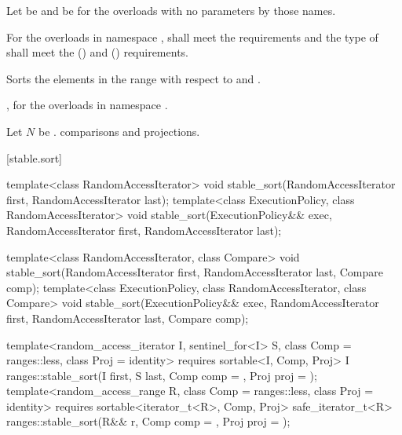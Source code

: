 \begin{itemdescr}
\pnum
Let  be 
and  be 
for the overloads with no parameters by those names.

\pnum
\requires
For the overloads in namespace ,
 shall meet
the  requirements and
the type of  shall meet
the  () and
 () requirements.

\pnum
\effects
Sorts the elements in the range 
with respect to  and .

\pnum
\returns
{}, for the overloads in namespace .

\pnum
\complexity
Let $N$ be .
 comparisons and projections.
\end{itemdescr}

[stable.sort]{}

%
\begin{itemdecl}
template<class RandomAccessIterator>
  void stable_sort(RandomAccessIterator first, RandomAccessIterator last);
template<class ExecutionPolicy, class RandomAccessIterator>
  void stable_sort(ExecutionPolicy&& exec,
                   RandomAccessIterator first, RandomAccessIterator last);

template<class RandomAccessIterator, class Compare>
  void stable_sort(RandomAccessIterator first, RandomAccessIterator last,
                   Compare comp);
template<class ExecutionPolicy, class RandomAccessIterator, class Compare>
  void stable_sort(ExecutionPolicy&& exec,
                   RandomAccessIterator first, RandomAccessIterator last,
                   Compare comp);

template<random_access_iterator I, sentinel_for<I> S, class Comp = ranges::less,
         class Proj = identity>
  requires sortable<I, Comp, Proj>
  I ranges::stable_sort(I first, S last, Comp comp = {}, Proj proj = {});
template<random_access_range R, class Comp = ranges::less, class Proj = identity>
  requires sortable<iterator_t<R>, Comp, Proj>
  safe_iterator_t<R>
    ranges::stable_sort(R&& r, Comp comp = {}, Proj proj = {});
\end{itemdecl}

